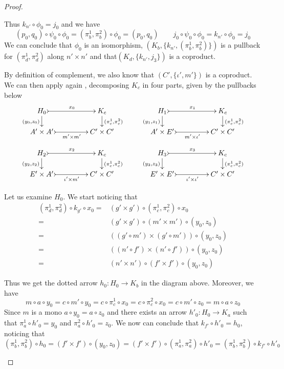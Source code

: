 \documentclass[3p]{elsarticle}
\theoremstyle{remark}
\theoremstyle{definition}
\begin{document}
\begin{proof}
\begin{enumerate}
{  Thus $k_{n'}\circ \phi_0=j_0$ and we have
 \[(p_0, q_0)\circ \psi_0\circ \phi_0=(\pi^1_b, \pi^2_b)\circ \phi_0=(p_0, q_0) \qquad  j_0\circ \psi_0\circ \phi_0 = k_{n'}\circ \phi_0=j_0\]
We can conclude that $\phi_0$ is an isomorphism, $(K_b, \{k_{n'}, (\pi^1_b, \pi^2_b)\})$ is a pullback for $(\pi^1_d, \pi^2_d)$ along $n'\times n'$ and  that$(K_d, \{k_{n'}, j_3\})$ is a coproduct.}
 
By definition of complement, we also know that $(C', \{\iota', m'\})$ is a coproduct. We can then apply again , decomposing $K_c$ in four parts, given by the pullbacks below
 \[\xymatrix@C=45pt@R=15pt{H_0 \ar@{>->}[r]^{x_0}  \ar[d]_{(y_0, z_0)}& K_c   \ar[d]^{(\pi^1_c, \pi^2_c)}& H_1 \ar@{>->}[r]^{x_1}  \ar[d]_{(y_1, z_1)} & K_c \ar[d]^{(\pi^1_c, \pi^2_c)} \\
 	A'\times A' \ar@{>->}[r]_-{m'\times m'} & C'\times C' & A'\times E' \ar@{>->}[r]_-{m'\times  \iota'} & C'\times C'}\]
 \[ \xymatrix@C=45pt@R=15pt{H_2 \ar@{>->}[r]^{x_2}  \ar[d]_{(y_2, z_2)}& K_c   \ar[d]^{(\pi^1_c, \pi^2_c)}& H_3 \ar@{>->}[r]^{x_3}  \ar[d]_{(y_3, z_3)} & K_c \ar[d]^{(\pi^1_c, \pi^2_c)} \\
 	E'\times A' \ar@{>->}[r]_-{\iota' \times m'} & C'\times C' & E'\times E' \ar@{>->}[r]_-{ \iota'\times  \iota'} & C'\times C'}\]
 
 \noindent
\parbox{7cm}{ Let us examine $H_0$. We start noticing that 
 \begin{align*}
 	(\pi^1_d, \pi^2_d)\circ k_{g'}\circ x_0=&(g'\times g')\circ(\pi^1_c, \pi^2_c)\circ x_0\\=&(g'\times g')\circ (m'\times m')\circ (y_0, z_0)\\=&((g'\circ m')\times (g'\circ m'))\circ (y_0, z_0)\\=&((n'\circ f')\times (n'\circ f'))\circ (y_0, z_0)\\=&(n'\times n')\circ (f'\times f')\circ (y_0, z_0) \end{align*}}\hfill \parbox{5cm}{}
 
 Thus we get the dotted arrow $h_0\colon H_0\to K_b$ in the diagram above. Moreover, we have
 \[m\circ a\circ y_0=c\circ m'\circ y_0=c\circ \pi^1_c\circ x_0=c\circ \pi^2_c\circ x_0=c\circ m'\circ z_0=m\circ a \circ z_0\]
 Since $m$ is a mono $a\circ y_0=a\circ z_0$ and there exists an arrow $h'_0\colon H_0\to K_a$ such that $\pi^1_a\circ h'_0=y_0$ and $\pi^2_a\circ h'_0=z_0$. 
 We now can conclude that $k_{f'}\circ h'_0=h_0$, noticing that
 \[(\pi^1_b, \pi^2_b)\circ h_0=(f'\times f')\circ (y_0, z_0)=(f'\times f')\circ (\pi^1_a, \pi^2_a)\circ h'_0=(\pi^1_b, \pi^2_b)\circ k_{f'}\circ h'_0\]


\end{enumerate}
\end{proof}
\end{document}
